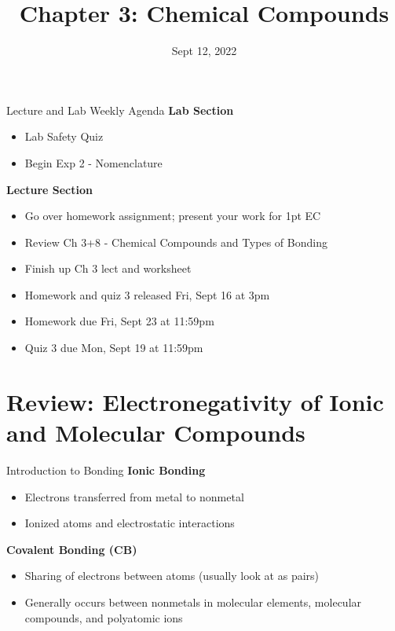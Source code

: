 \documentclass[11pt]{beamer}
\title{Chapter 3: Chemical Compounds}
\institute{Chemistry Department, Cypress College}
\date{Sept 12, 2022}
\begin{document}
\begin{frame}
  \titlepage
\end{frame}

\begin{frame}{Lecture and Lab Weekly Agenda}
  \textbf{Lab Section}

  \begin{itemize}
  \item Lab Safety Quiz
  \item Begin Exp 2 - Nomenclature
  \end{itemize}

  \textbf{Lecture Section}

  \begin{itemize}
  \item Go over homework assignment; present your work
    for 1pt EC
  \item Review Ch 3+8 - Chemical Compounds and Types of Bonding
  \item Finish up Ch 3 lect and worksheet
  \item Homework and quiz 3 released Fri, Sept 16 at 3pm
  \item Homework due Fri, Sept 23 at 11:59pm
  \item Quiz 3 due Mon, Sept 19 at 11:59pm
  \end{itemize}
\end{frame}

\section{Review: Electronegativity of Ionic and Molecular Compounds}

\begin{frame}{Introduction to Bonding}
  \textbf{Ionic Bonding}
  \begin{itemize}
  \item Electrons transferred from metal
    to nonmetal
  \item Ionized atoms and electrostatic interactions
  \end{itemize}

  \textbf{Covalent Bonding (CB)}
  \begin{itemize}
  \item Sharing of electrons between atoms (usually
    look at as pairs)
  \item Generally occurs between nonmetals in molecular
    elements, molecular compounds, and polyatomic ions
  \end{itemize}
\end{frame}
\end{document}
